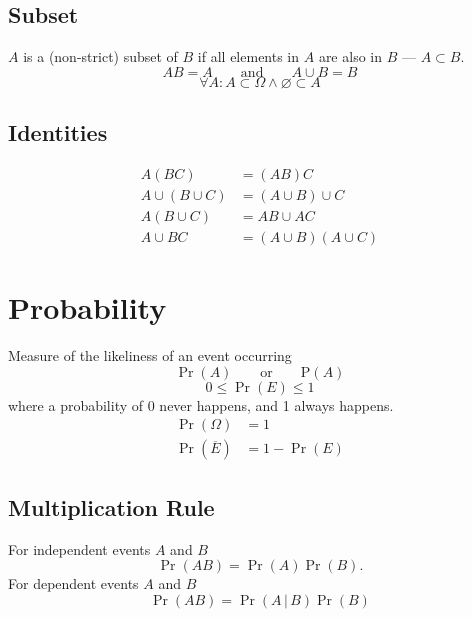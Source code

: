 \documentclass{article}
\begin{document}
\begin{multicols}{3}
    \subsection{Subset}
    \(A\) is a (non-strict) subset of \(B\) if all elements in \(A\) are also in \(B\) --- \(A \subset B\).
    \begin{equation*}
        AB = A \quad\quad \text{and} \quad\quad A \cup B = B
    \end{equation*}
    \begin{equation*}
        \forall A:A\subset \Omega \land \varnothing \subset A
    \end{equation*}
    \subsection{Identities}
    \begin{align*}
        A \left( BC \right)            & = \left( AB \right) C                             \\
        A \cup \left( B \cup C \right) & = \left( A \cup B \right) \cup C                  \\
        A \left(B \cup C\right)        & = AB \cup AC                                      \\
        A \cup BC                      & = \left( A \cup B \right) \left( A \cup C \right)
    \end{align*}
    \section{Probability}
    Measure of the likeliness of an event occurring
    \begin{equation*}
        \Pr{\left( A \right)} \quad\quad \text{or} \quad\quad \mathrm{P}\left( A \right)
    \end{equation*}
    \begin{equation*}
        0 \leq \Pr{\left( E \right)} \leq 1
    \end{equation*}
    where a probability of 0 never happens, and 1 always happens.
    \begin{align*}
        \Pr{\left( \Omega \right)}       & = 1                         \\
        \Pr{\left( \overline{E} \right)} & = 1 - \Pr{\left( E \right)}
    \end{align*}
    \subsection{Multiplication Rule}
    For independent events \(A\) and \(B\)
    \begin{equation*}
        \Pr{\left( AB \right)} = \Pr{\left( A \right)} \Pr{\left( B \right)}.
    \end{equation*}
    For dependent events \(A\) and \(B\)
    \begin{equation*}
        \Pr{\left( AB \right)} = \Pr{\left( A \,\vert\, B \right)} \Pr{\left( B \right)}
    \end{equation*}

\end{multicols}
\end{document}
